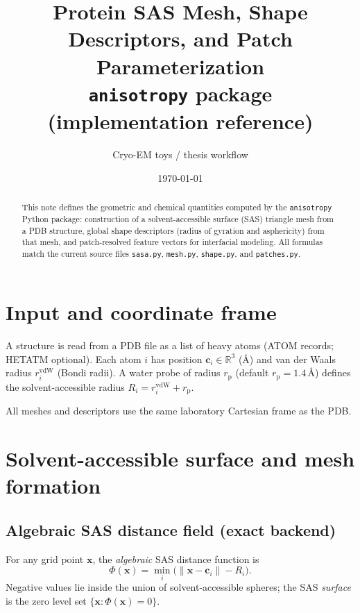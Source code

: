 \documentclass[11pt,a4paper]{article}
\title{Protein SAS Mesh, Shape Descriptors, and Patch Parameterization\\
\large \texttt{anisotropy} package (implementation reference)}
\author{Cryo-EM toys / thesis workflow}
\date{\today}
\begin{document}
\maketitle

\begin{abstract}
This note defines the geometric and chemical quantities computed by the
\texttt{anisotropy} Python package: construction of a solvent-accessible surface (SAS)
triangle mesh from a PDB structure, global shape descriptors (radius of gyration and
asphericity) from that mesh, and patch-resolved feature vectors for interfacial
modeling. All formulas match the current source files
\texttt{sasa.py}, \texttt{mesh.py}, \texttt{shape.py}, and \texttt{patches.py}.
\end{abstract}

\tableofcontents
\newpage

\section{Input and coordinate frame}

A structure is read from a PDB file as a list of heavy atoms (ATOM records; HETATM
optional). Each atom $i$ has position $\mathbf{c}_i\in\mathbb{R}^3$ ({\AA}) and
van der Waals radius $r_i^{\mathrm{vdW}}$ (Bondi radii). A water probe of radius
$r_{\mathrm{p}}$ (default $r_{\mathrm{p}}=1.4$\,{\AA}) defines the solvent-accessible
radius $R_i = r_i^{\mathrm{vdW}} + r_{\mathrm{p}}$.

All meshes and descriptors use the same laboratory Cartesian frame as the PDB.

\section{Solvent-accessible surface and mesh formation}

\subsection{Algebraic SAS distance field (exact backend)}

For any grid point $\mathbf{x}$, the \emph{algebraic} SAS distance function is
\begin{equation}
  \Phi(\mathbf{x})
  = \min_i \bigl( \|\mathbf{x}-\mathbf{c}_i\| - R_i \bigr).
  \label{eq:phi-exact}
\end{equation}
Negative values lie inside the union of solvent-accessible spheres; the SAS
\emph{surface} is the zero level set $\{\mathbf{x}:\Phi(\mathbf{x})=0\}$.
\end{document}
